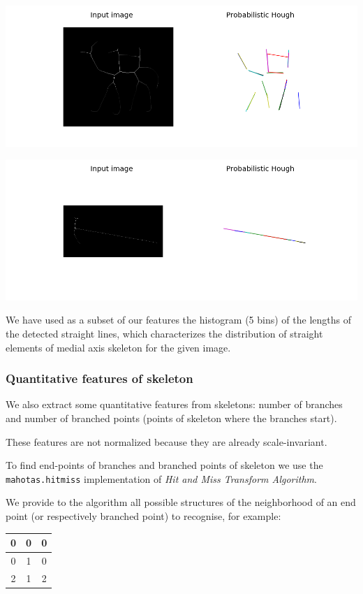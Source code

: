\documentclass[12pt]{article}
\begin{document}
\includegraphics[scale=0.6]{camel_764.png}
\vspace{12px}

\includegraphics[scale=0.6]{hammer_604.png}

We have used as a subset of our features the histogram (5 bins) of the lengths of the detected straight lines, which characterizes the distribution of straight elements of medial axis skeleton for the given image.

\subsubsection{Quantitative features of skeleton}
We also extract some quantitative features from skeletons: number of branches and number of branched points (points of skeleton where the branches start).

These features are not normalized because they are already scale-invariant.

To find end-points of branches and branched points of skeleton we use the \texttt{mahotas.hitmiss} implementation of \textit{Hit and Miss Transform Algorithm}.

We provide to the algorithm all possible structures of the neighborhood of an end point (or respectively branched point) to recognise, for example:

\begin{center}
 	\begin{tabular}{| c | c | c |}
 		\hline
		0 & 0 & 0 \\ \hline
		0 & 1 & 0 \\ \hline
		2 & 1 & 2 \\ \hline
	\end{tabular}
\end{center}
\end{document}
